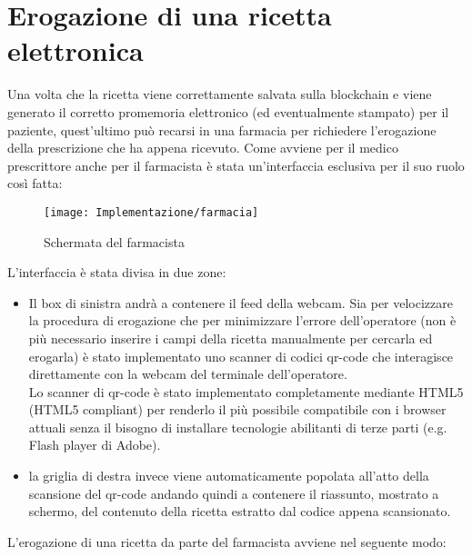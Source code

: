 \section{Erogazione di una ricetta elettronica}
%
Una volta che la ricetta viene correttamente salvata sulla blockchain e viene generato il corretto promemoria elettronico (ed eventualmente stampato) per il paziente, quest'ultimo può recarsi in una farmacia per richiedere l'erogazione della prescrizione che ha appena ricevuto. Come avviene per il medico prescrittore anche per il farmacista è stata un'interfaccia esclusiva per il suo ruolo così fatta:
%
\begin{figure}[H]
	\centering
	\texttt{[image: Implementazione/farmacia]}
	\caption{Schermata del farmacista}
	\label{fig:schermata del farmacista}
\end{figure}
L'interfaccia è stata divisa in due zone:
\begin{itemize}
	\item Il box di sinistra andrà a contenere il feed della webcam. Sia per velocizzare la procedura di erogazione che per minimizzare l'errore dell'operatore (non è più necessario inserire i campi della ricetta manualmente per cercarla ed erogarla) è stato implementato uno scanner di codici qr-code che interagisce direttamente con la webcam del terminale dell'operatore. \\
	      Lo scanner di qr-code è stato implementato completamente mediante HTML5 (HTML5 compliant) per renderlo il più possibile compatibile con i browser attuali senza il bisogno di installare tecnologie abilitanti di terze parti (e.g. Flash player di Adobe).
	\item la griglia di destra invece viene automaticamente popolata all'atto della scansione del qr-code andando quindi a contenere il riassunto, mostrato a schermo, del contenuto della ricetta estratto dal codice appena scansionato.
\end{itemize}
L'erogazione di una ricetta da parte del farmacista avviene nel seguente modo:
